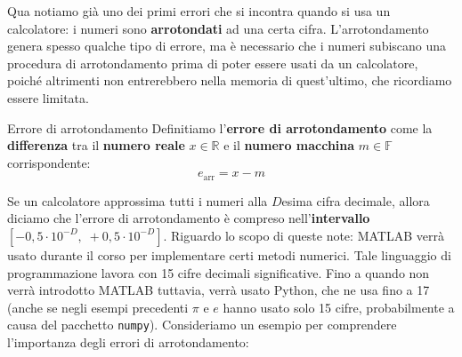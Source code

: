 Qua notiamo già uno dei primi errori che si incontra quando si usa un calcolatore: i numeri sono \textbf{arrotondati} ad una certa cifra. L'arrotondamento genera spesso qualche tipo di errore, ma è necessario che i numeri subiscano una procedura di arrotondamento prima di poter essere usati da un calcolatore, poiché altrimenti non entrerebbero nella memoria di quest'ultimo, che ricordiamo essere limitata.

\begin{definition}{Errore di arrotondamento}
    Definitiamo l'\textbf{errore di arrotondamento} come la \textbf{differenza} tra il \textbf{numero reale} $x \in \mathbb{R}$ e il \textbf{numero macchina} $m \in \mathbb{F}$ corrispondente:
    \[ e_\text{arr} = x - m \]
\end{definition}

Se un calcolatore approssima tutti i numeri alla $D$esima cifra decimale, allora diciamo che l'errore di arrotondamento è compreso nell'\textbf{intervallo} $[-0,5 \cdot 10^{-D}, \; +0,5 \cdot 10^{-D}]$.
\nwl
Riguardo lo scopo di queste note: MATLAB verrà usato durante il corso per implementare certi metodi numerici. Tale linguaggio di programmazione lavora con 15 cifre decimali significative. Fino a quando non verrà introdotto MATLAB tuttavia, verrà usato Python, che ne usa fino a 17 (anche se negli esempi precedenti $\pi$ e $e$ hanno usato solo 15 cifre, probabilmente a causa del pacchetto \verb|numpy|).
\nwl
Consideriamo un esempio per comprendere l'importanza degli errori di arrotondamento:
